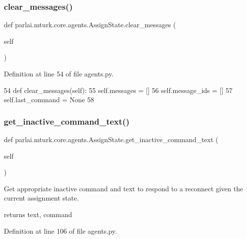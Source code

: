 \subsubsection{\texorpdfstring{clear\+\_\+messages()}{clear\_messages()}}
{\footnotesize\ttfamily def parlai.\+mturk.\+core.\+agents.\+Assign\+State.\+clear\+\_\+messages (\begin{DoxyParamCaption}\item[{}]{self }\end{DoxyParamCaption})}



Definition at line 54 of file agents.\+py.


\begin{DoxyCode}
54     \textcolor{keyword}{def }clear\_messages(self):
55         self.messages = []
56         self.message\_ids = []
57         self.last\_command = \textcolor{keywordtype}{None}
58 
\end{DoxyCode}
\mbox{\label{classparlai_1_1mturk_1_1core_1_1agents_1_1AssignState_aeda3adf715e8ed5a39d302792b056960}} 
\subsubsection{\texorpdfstring{get\+\_\+inactive\+\_\+command\+\_\+text()}{get\_inactive\_command\_text()}}
{\footnotesize\ttfamily def parlai.\+mturk.\+core.\+agents.\+Assign\+State.\+get\+\_\+inactive\+\_\+command\+\_\+text (\begin{DoxyParamCaption}\item[{}]{self }\end{DoxyParamCaption})}

\begin{DoxyVerb}Get appropriate inactive command and text to respond to a reconnect given the
current assignment state.

returns text, command
\end{DoxyVerb}
 

Definition at line 106 of file agents.\+py.


